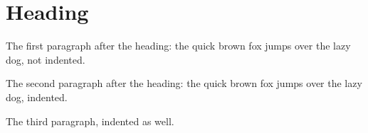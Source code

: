\documentclass{article}
\begin{document}
\section{Heading}
The first paragraph after the heading: the quick brown fox jumps over the lazy dog, not indented.

The second paragraph after the heading: the quick brown fox jumps over the lazy dog, indented.

The third paragraph, indented as well.
\end{document}

